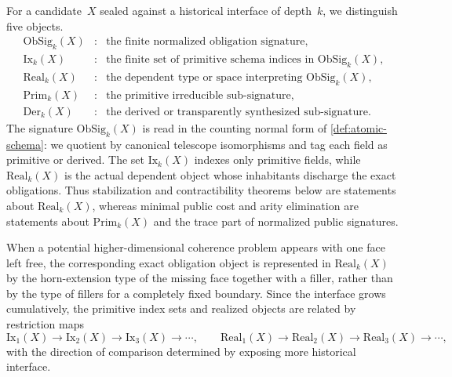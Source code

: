 \documentclass{lmcs}
\newcommand{\ObSig}{\mathrm{ObSig}}
\newcommand{\Ix}{\mathrm{Ix}}
\newcommand{\Real}{\mathrm{Real}}
\newcommand{\Prim}{\mathrm{Prim}}
\newcommand{\Der}{\mathrm{Der}}
\begin{document}
\begin{defi}
\label{def:obligations}
For a candidate~$X$ sealed against a historical interface of depth~$k$, we distinguish five objects.
\[
\begin{array}{rcl}
  \ObSig_k(X) &:& \text{the finite normalized obligation signature},\\
  \Ix_k(X) &:& \text{the finite set of primitive schema indices in } \ObSig_k(X),\\
  \Real_k(X) &:& \text{the dependent type or space interpreting } \ObSig_k(X),\\
  \Prim_k(X) &:& \text{the primitive irreducible sub-signature},\\
  \Der_k(X) &:& \text{the derived or transparently synthesized sub-signature}.
\end{array}
\]
The signature $\ObSig_k(X)$ is read in the counting normal form of \autoref{def:atomic-schema}: we quotient by canonical telescope isomorphisms and tag each field as primitive or derived. The set $\Ix_k(X)$ indexes only primitive fields, while $\Real_k(X)$ is the actual dependent object whose inhabitants discharge the exact obligations. Thus stabilization and contractibility theorems below are statements about $\Real_k(X)$, whereas minimal public cost and arity elimination are statements about $\Prim_k(X)$ and the trace part of normalized public signatures.

When a potential higher-dimensional coherence problem appears with one face left free, the corresponding exact obligation object is represented in $\Real_k(X)$ by the horn-extension type of the missing face together with a filler, rather than by the type of fillers for a completely fixed boundary. Since the interface grows cumulatively, the primitive index sets and realized objects are related by restriction maps
\[
  \Ix_1(X) \to \Ix_2(X) \to \Ix_3(X) \to \cdots,
  \qquad
  \Real_1(X) \to \Real_2(X) \to \Real_3(X) \to \cdots,
\]
with the direction of comparison determined by exposing more historical interface.
\end{defi}
\end{document}
